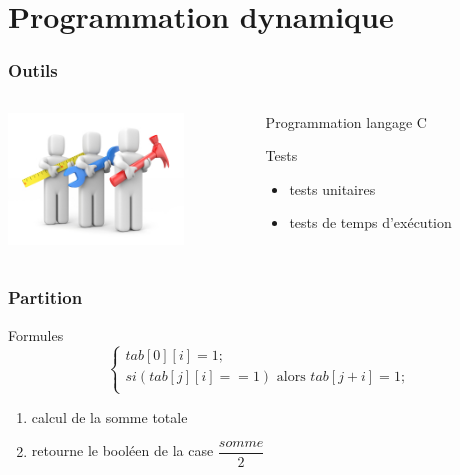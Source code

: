 \documentclass[french]{beamer}
\begin{document}
\section{Programmation dynamique}

\begin{frame}
  \frametitle{Outils}
  \begin{columns}
    \begin{column}[]{5cm}
      \begin{center}
        \includegraphics[height=3.5cm]{tools.jpeg}
      \end{center}
    \end{column}
      \begin{column}[]{5cm}
         \begin{block}{Programmation}
        langage C
      \end{block}
      \begin{block}{Tests}
        \begin{itemize}
        \item tests unitaires
        \item tests de temps d'exécution
        \end{itemize}
      \end{block}
      \end{column}
    \end{columns}
  \end{frame}

\begin{frame}
  \frametitle{Partition}
  \begin{alertblock}{Formules}
    \begin{equation}
      \begin{cases}
        tab[0][i] = 1; \\ si ( tab[j][i] == 1 )\text{~alors~} tab[j +
          i] = 1; \\
      \end{cases}
    \end{equation}
  \end{alertblock}
\begin{enumerate}
\item calcul de la somme totale 
\item retourne le booléen de la case $\dfrac{somme}{2}$
\end{enumerate}
\end{frame}
\end{document}
